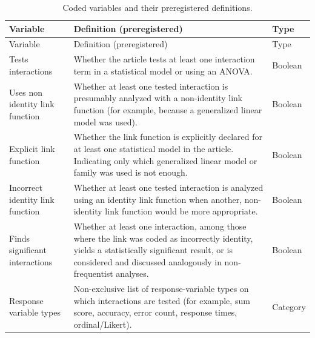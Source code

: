 \documentclass[
  man,
  floatsintext,
  longtable,
  nolmodern,
  notxfonts,
  notimes,
  colorlinks=true,linkcolor=blue,citecolor=blue,urlcolor=blue]{apa7}
\begin{document}
\begin{longtable}[]{@{}
  >{\raggedright\arraybackslash}p{}
  >{\raggedright\arraybackslash}p{}
  >{\raggedright\arraybackslash}p{}@{}}
\caption{Coded variables and their preregistered
definitions.}\label{tbl-variables}\tabularnewline
\toprule\noalign{}
\begin{minipage}[b]{\linewidth}\raggedright
Variable
\end{minipage} & \begin{minipage}[b]{\linewidth}\raggedright
Definition (preregistered)
\end{minipage} & \begin{minipage}[b]{\linewidth}\raggedright
Type
\end{minipage} \\
\midrule\noalign{}
\endfirsthead
\toprule\noalign{}
\begin{minipage}[b]{\linewidth}\raggedright
Variable
\end{minipage} & \begin{minipage}[b]{\linewidth}\raggedright
Definition (preregistered)
\end{minipage} & \begin{minipage}[b]{\linewidth}\raggedright
Type
\end{minipage} \\
\midrule\noalign{}
\endhead
\bottomrule\noalign{}
\endlastfoot
Tests interactions & Whether the article tests at least one interaction
term in a statistical model or using an ANOVA. & Boolean \\
Uses non identity link function & Whether at least one tested
interaction is presumably analyzed with a non-identity link function
(for example, because a generalized linear model was used). & Boolean \\
Explicit link function & Whether the link function is explicitly
declared for at least one statistical model in the article. Indicating
only which generalized linear model or family was used is not enough. &
Boolean \\
Incorrect identity link function & Whether at least one tested
interaction is analyzed using an identity link function when another,
non-identity link function would be more appropriate. & Boolean \\
Finds significant interactions & Whether at least one interaction, among
those where the link was coded as incorrectly identity, yields a
statistically significant result, or is considered and discussed
analogously in non-frequentist analyses. & Boolean \\
Response variable types & Non-exclusive list of response-variable types
on which interactions are tested (for example, sum score, accuracy,
error count, response times, ordinal/Likert). & Category \\
\end{longtable}
\end{document}
